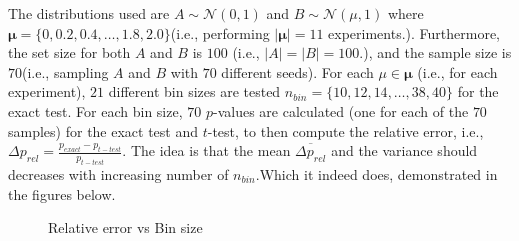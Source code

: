 \documentclass[a4paper]{article}
\begin{document}
The distributions used are $A \sim \mathcal{N}(0,1)$ and $B \sim \mathcal{N}(\mu,1)$ where $\boldsymbol{\mu} = \{0, 0.2, 0.4, \ldots, 1.8, 2.0 \}$(i.e., performing $|\boldsymbol{\mu}|=11$ experiments.). Furthermore, the set size for both $A$ and $B$ is $100$ (i.e., $|A|=|B|=100$.), and the sample size is $70$(i.e., sampling $A$ and $B$ with $70$ different seeds). For each $\mu \in \boldsymbol{\mu}$ (i.e., for each experiment), $21$ different bin sizes are tested $n_{bin}=\{10,12,14,\ldots,38,40\}$ for the exact test. For each bin size, $70$ $p$-values are calculated (one for each of the $70$ samples) for the exact test and $t$-test, to then compute the relative error, i.e.,  $\Delta p _{rel} = \frac{p_{exact}-p_{t-test}}{p_{t-test}}$. The idea is that the mean $\overline{\Delta p _{rel}}$ and the variance should decreases with increasing number of $n_{bin}$.Which it indeed does, demonstrated in the figures below.
\begin{figure}[H]
  \centering
  \hfill
  \caption{Relative error vs Bin size}
\end{figure}
\end{document}
